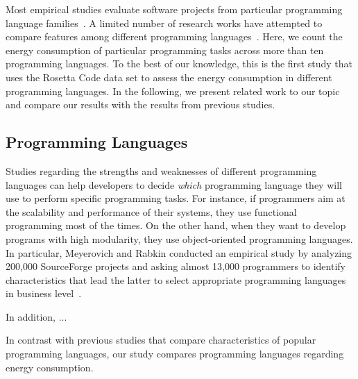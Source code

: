 Most empirical studies evaluate software projects
from particular programming language families~\cite{XX}.
A limited number of research works have attempted to compare
features among different programming languages~\cite{XX}.
Here, we count the energy consumption of particular
programming tasks across more than ten programming languages.
To the best of our knowledge,
this is the first study that uses the Rosetta Code data set
to assess the energy consumption in different programming languages.
In the following, we present related work to our topic
and compare our results with the results
from previous studies.

\subsection{Programming Languages}
Studies regarding the strengths and weaknesses of
different programming languages
can help developers to decide {\it which} programming language
they will use to perform specific programming tasks.
For instance, if programmers aim at the scalability
and performance of their systems,
they use functional programming most of the times.
On the other hand, when they want to develop
programs with high modularity,
they use object-oriented programming languages.
In particular, Meyerovich and Rabkin
conducted an empirical study by analyzing
200,000 SourceForge projects
and asking almost 13,000 programmers to
identify characteristics that lead the latter
to select appropriate programming languages in business level~\cite{MR13}.

In addition, ... %

In contrast with previous studies that compare
characteristics of popular programming languages,
our study compares programming languages regarding
energy consumption.

